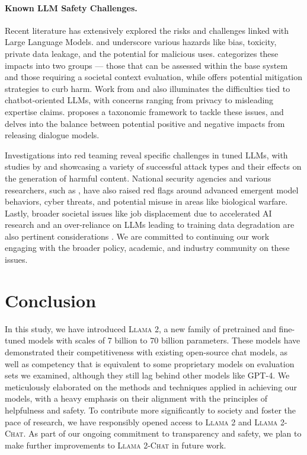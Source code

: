 \documentclass{article}
\newcommand{\modelname}{\textsc{Llama 2-Chat}\xspace}
\newcommand{\cinnamon}{\textsc{Llama 2}\xspace}
\begin{document}
\paragraph{Known LLM Safety Challenges.}
\label{sec:safety_background}
Recent literature has extensively explored the risks and challenges linked with Large Language Models. \cite{bender2021dangers} and \citet{weidinger2021ethical} underscore various hazards like bias, toxicity, private data leakage, and the potential for malicious uses. \citet{solaiman2023evaluating} categorizes these impacts into two groups --- those that can be assessed within the base system and those requiring a societal context evaluation, while \citet{kumar2022language} offers potential mitigation strategies to curb harm. Work from \citet{roller2020open} and \citet{dinan2021anticipating} also illuminates the difficulties tied to chatbot-oriented LLMs, with concerns ranging from privacy to misleading expertise claims. \citet{deng2023recent}  proposes a taxonomic framework to tackle these issues, and \citet{bergman2022guiding} delves into the balance between potential positive and negative impacts from releasing dialogue models.

Investigations into red teaming reveal specific challenges in tuned LLMs, with studies by \citet{ganguli2022red} and \citet{zhuo2023exploring} showcasing a variety of successful attack types and their effects on the generation of harmful content. National security agencies and various researchers, such as \citep{mialon2023augmented}, have also raised red flags around advanced emergent model behaviors, cyber threats, and potential misuse in areas like biological warfare. Lastly, broader societal issues like job displacement due to accelerated AI research and an over-reliance on LLMs leading to training data degradation are also pertinent considerations \citep{acemoglu2018artificial,autor2018automation,webb2019impact, shumailov2023curse}. We are committed to continuing our work engaging with the broader policy, academic, and industry community on these issues. 

\section{Conclusion}
\label{sec:conclusion}
In this study, we have introduced \cinnamon, a new family of pretrained and fine-tuned models with scales of 7 billion to 70 billion parameters. These models have demonstrated their competitiveness with existing open-source chat models, as well as competency that is equivalent to some proprietary models on evaluation sets we examined, although they still lag behind other models like GPT-4. We meticulously elaborated on the methods and techniques applied in achieving our models, with a heavy emphasis on their alignment with the principles of helpfulness and safety. To contribute more significantly to society and foster the pace of research, we have responsibly opened access to \cinnamon and \modelname{}. As part of our ongoing commitment to transparency and safety, we plan to make further improvements to \modelname{} in future work.
\end{document}

